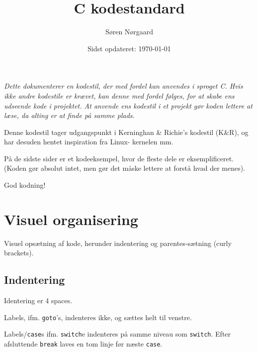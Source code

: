 \documentclass[article, 10pt]{memoir}
\title{C kodestandard}
\author{Søren Nørgaard}
\date{Sidst opdateret: \today}
\let\tempone\itemize
\let\temptwo\enditemize
\renewenvironment{itemize}{\tempone\firmlist}{\temptwo}
\begin{document}
\maketitle
\begin{multicols}{2}

    {
        \itshape
        Dette dokumenterer en kodestil, der med fordel kan anvendes i sproget C. Hvis ikke andre kodestile er krævet, kan denne med fordel følges, for at skabe ens udseende kode i projektet. At anvende ens kodestil i et projekt gør koden lettere at læse, da alting er at finde på samme plads.

        Denne kodestil tager udgangspunkt i Kerninghan \& Richie's kodestil (K\&R), og har desuden hentet inspiration fra Linux- kernelen mm.

        På de sidste sider er et kodeeksempel, hvor de fleste dele er eksemplificeret. (Koden gør absolut intet, men gør det måske lettere at forstå hvad der menes).

        God kodning!
    }
    \tableofcontents

    \chapter{Visuel organisering}
    Visuel opsætning af kode, herunder indentering og parentes-sætning (curly brackets).

    \section{Indentering}
    \begin{itemize}
    \item Identering er 4 spaces.
    \item Labels, ifm. \texttt{goto}'s, indenteres ikke, og sættes helt til venstre.
    \item Labels/\texttt{case}s ifm. \texttt{switch}e indenteres på samme niveau som \texttt{switch}. Efter afsluttende \texttt{break} laves en tom linje før næste \texttt{case}.
    \end{itemize}


\end{multicols}
\end{document}
